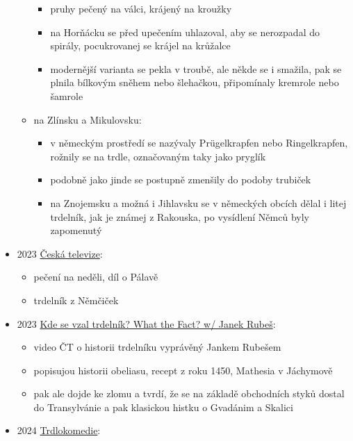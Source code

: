\begin{itemize}
\begin{itemize}
    \begin{itemize}
    \tightlist
    \item
      pruhy pečený na válci, krájený na kroužky
    \item
      na Horňácku se před upečením uhlazoval, aby se nerozpadal do
      spirály, pocukrovanej se krájel na krůžalce
    \item
      modernější varianta se pekla v troubě, ale někde se i smažila, pak
      se plnila bílkovým sněhem nebo šlehačkou, připomínaly kremrole
      nebo šamrole
    \end{itemize}
  \item
    na Zlínsku a Mikulovsku:

    \begin{itemize}
    \tightlist
    \item
      v německým prostředí se nazývaly Prügelkrapfen nebo Ringelkrapfen,
      rožnily se na trdle, označovaným taky jako pryglík
    \item
      podobně jako jinde se postupně zmenšily do podoby trubiček
    \item
      na Znojemsku a možná i Jihlavsku se v německých obcích dělal i
      litej trdelník, jak je známej z Rakouska, po vysídlení Němců byly
      zapomenutý
    \end{itemize}
  \end{itemize}
\item
  2023
  \href{https://www.ceskatelevize.cz/porady/13889655314-peceni-na-nedeli/222544160510009/cast/947232/}{Česká
  televize}:

  \begin{itemize}
  \tightlist
  \item
    pečení na neděli, díl o Pálavě
  \item
    trdelník z Němčiček
  \end{itemize}
\item
  2023 \href{https://www.youtube.com/watch?v=MPNEFr6O-Dw}{Kde se vzal
  trdelník? What the Fact? w/ Janek Rubeš}:

  \begin{itemize}
  \tightlist
  \item
    video ČT o historii trdelníku vyprávěný Jankem Rubešem
  \item
    popisujou historii obeliasu, recept z roku 1450, Mathesia v
    Jáchymově
  \item
    pak ale dojde ke zlomu a tvrdí, že se na základě obchodních styků
    dostal do Transylvánie a pak klasickou histku o Gvadánim a Skalici
  \end{itemize}
\item
  2024
  \href{https://reportermagazin.cz/79410/trdlokomedie-lukrativni-byznys-tahanice-a-tezke-vahy-v-pozadi/}{Trdlokomedie}:


\end{itemize}
